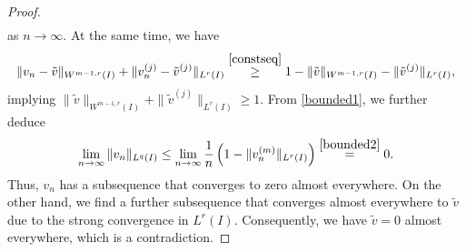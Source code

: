 \documentclass[10pt,a4paper]{amsart}
\newcommand{\tilv}{\tilde{v}}
\begin{document}
\begin{proof}
\begin{align}
\end{align}
as $n \to \infty$. At the same time, we have 
\begin{align}
    \|v_n-\tilv \|_{W^{m-1,r}(I)}+ \|v_n^{(j)}- \tilv^{(j)}\|_{L^r(I)} 
    \overset{\eqref{constseq}}{\geq} 1 - \|\tilv \|_{W^{m-1,r}(I)} - \|\tilv^{(j)}\|_{L^r(I)},
\end{align}
implying $\|\tilv \|_{W^{m-1,r}(I)} + \|\tilv^{(j)}\|_{L^r(I)} \geq 1$.
From \eqref{bounded1}, we further deduce
\begin{align}
    \lim_{n\to \infty} \|v_n\|_{L^q(I)} \leq \lim_{n \to \infty} \frac 1n \left(1-\|v_n^{(m)}\|_{L^r(I)}\right) \overset{\eqref{bounded2}}{=} 0.
\end{align}
Thus, $v_n$ has a subsequence that converges to zero almost everywhere. On the other hand, we find a further subsequence that converges almost everywhere to $\tilv$ due to the strong convergence in $L^r(I)$. Consequently, we have $\tilv = 0$ almost everywhere, which is a contradiction.
\end{proof}
\end{document}
